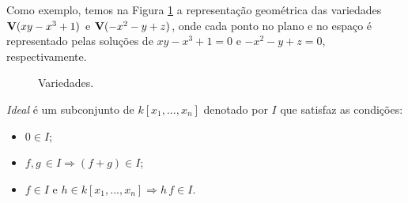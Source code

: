 \documentclass[a4paper,12pt,oneside,onecolumn,final,fleqn]{repUERJ}
\begin{document}
Como exemplo, temos na Figura \ref{fig.variedades} a representação geométrica das variedades ${\bf V}(xy-x^3+1)$ e ${\bf V}(-x^2-y+z)$, onde cada ponto no plano e no espaço é representado pelas soluções de $xy-x^3+1=0$ e $-x^2-y+z=0$, respectivamente.
\begin{figure}[!htb]{\textwidth}
\caption{Variedades.}
\hfill
{}\hfill
{}
\label{fig.variedades}
\end{figure} 

{\it Ideal} é um subconjunto de $k[x_1,...,x_n]$ denotado por $I$ que satisfaz as condições:
\begin{itemize}
\item $0\in I$;
\item $f,g\,\in I \Rightarrow (f+g)\in I$;
\item $f \in I$ e $h \in k[x_1,...,x_n] \Rightarrow h\,f \in I$. 
\end{itemize}
\end{document}
